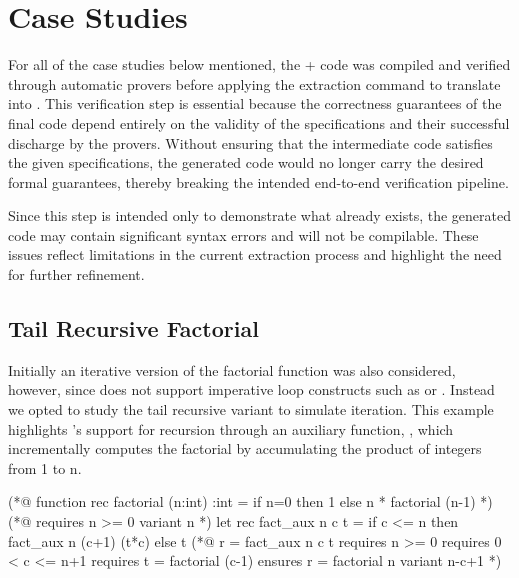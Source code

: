

\section{Case Studies}

For all of the case studies below mentioned, the \ocaml + \gospel code was compiled and verified through \whythree automatic
provers before applying the extraction command to translate into \cml. This verification step is essential because the correctness 
guarantees of the final \cml code depend entirely on the validity of the specifications and their successful discharge by the 
provers. Without ensuring that the \whyml intermediate code satisfies the given specifications, the generated \cml code would 
no longer carry the desired formal guarantees, thereby breaking the intended end-to-end verification pipeline.

Since this step is intended only to demonstrate what already exists, the generated code may contain significant syntax errors 
and will not be compilable. These issues reflect limitations in the current extraction process and highlight the need for 
further refinement.

\subsection{Tail Recursive Factorial}


Initially an iterative version of the factorial function was also considered, however, since \cml does not support imperative loop 
constructs such as  or . Instead we opted to study the tail recursive variant to simulate 
iteration. This example highlights \ocaml's support for recursion through an auxiliary function, , 
which incrementally computes the factorial by accumulating the product of integers from 1 to n.

\begin{gospell}
(*@ 
  function rec factorial (n:int) :int = 
    if n=0 then 1 else n * factorial (n-1)
*)
(*@ 
  requires n >= 0
  variant n
*)
let rec fact_aux n c t =
  if c <= n then fact_aux n (c+1) (t*c) else t
(*@
  r = fact_aux n c t
  requires n >= 0
  requires 0 < c <= n+1
  requires t = factorial (c-1)
  ensures r = factorial n
  variant n-c+1
*)
\end{gospell}



